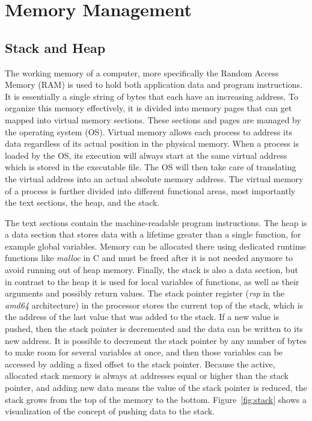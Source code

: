 
\section{Memory Management}\label{sec:background:memory}



\subsection{Stack and Heap}\label{subsec:background:memory:stack-heap}

The working memory of a computer, more specifically the Random Access Memory (\acrshort{RAM}) is used to hold both
application data and program instructions.
It is essentially a single string of bytes that each have an increasing address.
To organize this memory effectively, it is divided into memory pages that can get mapped into virtual memory sections.
These sections and pages are managed by the operating system (\acrshort{OS}).
Virtual memory allows each process to address its data regardless of its actual position in the physical memory.
When a process is loaded by the \acrshort{OS}, its execution will always start at the same virtual address which is
stored in the executable file.
The \acrshort{OS} will then take care of translating the virtual address into an actual absolute memory address.
The virtual memory of a process is further divided into different functional areas, most importantly the text sections,
the heap, and the stack.

The text sections contain the machine-readable program instructions.
The heap is a data section that stores data with a lifetime greater than a single function, for example global
variables.
Memory can be allocated there using dedicated runtime functions like \textit{malloc} in C and must be freed after it is
not needed anymore to avoid running out of heap memory.
Finally, the stack is also a data section, but in contrast to the heap it is used for local variables of functions, as
well as their arguments and possibly return values.
The stack pointer register (\textit{rsp} in the \textit{amd64} architecture) in the processor stores the current top
of the stack, which is the address of the last value that was added to the stack.
If a new value is pushed, then the stack pointer is decremented and the data can be written to its new address.
It is possible to decrement the stack pointer by any number of bytes to make room for several variables at once, and
then those variables can be accessed by adding a fixed offset to the stack pointer.
Because the active, allocated stack memory is always at addresses equal or higher than the stack pointer, and adding
new data means the value of the stack pointer is reduced, the stack grows from the top of the memory to the bottom.
Figure~\ref{fig:stack} shows a visualization of the concept of pushing data to the stack.

